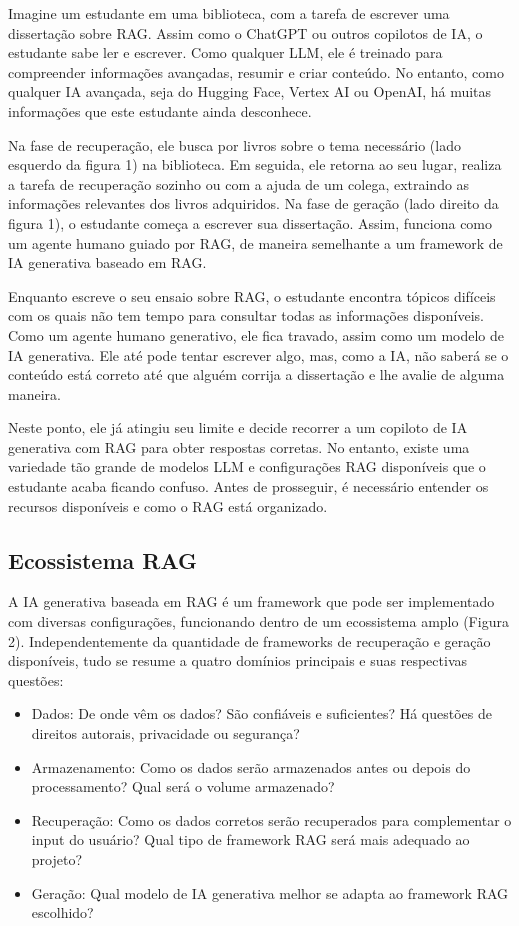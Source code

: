 \documentclass[a4paper, 12pt]{article}
\begin{document}
    Imagine um estudante em uma biblioteca, com a tarefa de escrever uma dissertação sobre RAG. Assim como o ChatGPT ou outros copilotos de IA, o estudante sabe ler e escrever. Como qualquer LLM, ele é treinado para compreender informações avançadas, resumir e criar conteúdo. No entanto, como qualquer IA avançada, seja do Hugging Face, Vertex AI ou OpenAI, há muitas informações que este estudante ainda desconhece.

    Na fase de recuperação, ele busca por livros sobre o tema necessário (lado esquerdo da figura 1) na biblioteca. Em seguida, ele retorna ao seu lugar, realiza a tarefa de recuperação sozinho ou com a ajuda de um colega, extraindo as informações relevantes dos livros adquiridos. Na fase de geração (lado direito da figura 1), o estudante começa a escrever sua dissertação. Assim, funciona como um agente humano guiado por RAG, de maneira semelhante a um framework de IA generativa baseado em RAG.

    Enquanto escreve o seu ensaio sobre RAG, o estudante encontra tópicos difíceis com os quais não tem tempo para consultar todas as informações disponíveis. Como um agente humano generativo, ele fica travado, assim como um modelo de IA generativa. Ele até pode tentar escrever algo, mas, como a IA, não saberá se o conteúdo está correto até que alguém corrija a dissertação e lhe avalie de alguma maneira.

    Neste ponto, ele já atingiu seu limite e decide recorrer a um copiloto de IA generativa com RAG para obter respostas corretas. No entanto, existe uma variedade tão grande de modelos LLM e configurações RAG disponíveis que o estudante acaba ficando confuso. Antes de prosseguir, é necessário entender os recursos disponíveis e como o RAG está organizado.

    \subsection{Ecossistema RAG}

    A IA generativa baseada em RAG é um framework que pode ser implementado com diversas configurações, funcionando dentro de um ecossistema amplo (Figura 2). Independentemente da quantidade de frameworks de recuperação e geração disponíveis, tudo se resume a quatro domínios principais e suas respectivas questões:
    
    \begin{itemize}
        \item Dados: De onde vêm os dados? São confiáveis e suficientes? Há questões de direitos autorais, privacidade ou segurança?
        \item Armazenamento: Como os dados serão armazenados antes ou depois do processamento? Qual será o volume armazenado?
        \item Recuperação: Como os dados corretos serão recuperados para complementar o input do usuário? Qual tipo de framework RAG será mais adequado ao projeto?
        \item Geração: Qual modelo de IA generativa melhor se adapta ao framework RAG escolhido?
    \end{itemize} 
\end{document}
